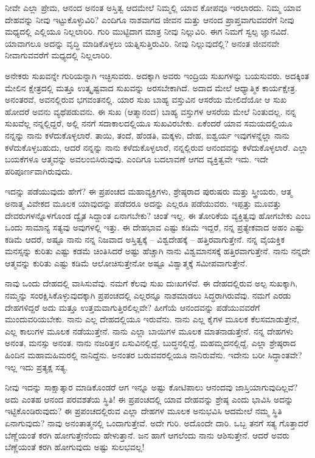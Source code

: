 ನೀವೇ ಎಲ್ಲಾ ಪ್ರೇಮ, ಆನಂದ ಅನಂತ ಅಸ್ತಿತ್ವ ಆದಮೇಲೆ ನಿಮ್ಮಲ್ಲಿ ಯಾವ ಕೋಪವೂ ಇರಲಾರದು. ನಿಮ್ಮ ಯಾವ ದೇಹವನ್ನು ನೀವು ಇಟ್ಟುಕೊಳ್ಳುವಿರಿ? ಎಂದಿಗೂ ನಾಶವಾಗದ ಜೀವನ ಮತ್ತು ಆನಂದ ಪ್ರಾಪ್ತವಾಗುವವರೆಗೆ ನೀವು ಮಧ್ಯದಲ್ಲಿ ಎಲ್ಲಿಯೂ ನಿಲ್ಲಲಾರಿರಿ. ಗುರಿ ಮುಟ್ಟಿದಾಗ ಮಾತ್ರ ನೀವು ನಿಲ್ಲುವಿರಿ. ಈಗ ನಿಮಗೆ ಸ್ವಲ್ಪ ಜ್ಞಾನವಿದೆ. ಯಾವಾಗಲೂ ಅದನ್ನು ವೃದ್ಧಿ ಮಾಡಿಕೊಳ್ಳಲು ಯತ್ನಿಸುತ್ತಿರುವಿರಿ. ನೀವು ನಿಲ್ಲುವುದೆಲ್ಲಿ? ಅನಂತ ಜೀವನವೇ ನೀವಾಗುವವರೆಗೆ ಮಧ್ಯದಲ್ಲಿ ನಿಲ್ಲಲಾರಿರಿ.

ಅನೇಕರು ಸುಖವನ್ನೇ ಗುರಿಯನ್ನಾಗಿ ಇಚ್ಛಿಸುವರು. ಅದಕ್ಕಾಗಿ ಅವರು ಇಂದ್ರಿಯ ಸುಖಗಳನ್ನು ಬಯಸುವರು. ಅದಕ್ಕಿಂತ ಮೇಲಿನ ಕ್ಷೇತ್ರದಲ್ಲಿ ಮತ್ತೂ ಉತ್ಕೃಷ್ಟವಾದ ಸುಖವನ್ನು ಅರಸಬೇಕಾಗಿದೆ. ಅದಾದ ಮೇಲೆ ಆಧ್ಯಾತ್ಮಿಕ ಕಾರ್ಯಕ್ಷೇತ್ರ. ಅನಂತರವೆ, ಅವನಲ್ಲಿರುವ ಭಗವಂತನಲ್ಲಿ. ಯಾರ ಸುಖ ಬಾಹ್ಯ ವಸ್ತುವಿನ ಆಸರೆಯ ಮೇಲಿದೆಯೋ ಆ ಸುಖ ಹೋದರೆ ಅವನು ವ್ಯಥೆಪಡುವನು. ಈ ಸುಖ (ಆತ್ಮಾನಂದ) ಬಾಹ್ಯ ವಸ್ತುಗಳ ಆಸರೆಯ ಮೇಲೆ ನಿಂತುದಲ್ಲ. ನನ್ನ ಸುಖವೆಲ್ಲ ನನ್ನಲ್ಲಿದ್ದರೆ, ಅಲ್ಲಿ ನನಗೆ ಸದಾಕಾಲದಲ್ಲಿಯೂ ಸುಖವಿರಬೇಕು. ಏಕೆಂದರೆ ಯಾವ ಸಮಯದಲ್ಲಿಯೂ ನನ್ನನ್ನು ನಾನು ಕಳೆದುಕೊಳ್ಳಲಾರೆ. ತಾಯಿ, ತಂದೆ, ಹೆಂಡತಿ, ಮಕ್ಕಳು, ದೇಹ, ಐಶ್ವರ್ಯ ಇವುಗಳನ್ನೆಲ್ಲಾ ನಾನು ಕಳೆದುಕೊಳ್ಳಬಹುದು, ಆದರೆ ನನ್ನನ್ನು ನಾನು ಕಳೆದುಕೊಳ್ಳಲಾರೆ, ನನ್ನಲ್ಲಿರುವ ಆನಂದವನ್ನು ಕಳೆದುಕೊಳ್ಳಲಾರೆ. ಎಲ್ಲಾ ಬಯಕೆಗಳೂ ಆತ್ಮವನ್ನು ಅವಲಂಬಿಸಿರುವುವು. ಎಂದಿಗೂ ಬದಲಾವಣೆ ಆಗದ ವ್ಯಕ್ತಿತ್ವವೇ ಇದು. ಇದೇ ಪರಿಪೂರ್ಣವಾಗಿರುವುದು.

ಇದನ್ನು ಪಡೆಯುವುದು ಹೇಗೆ? ಈ ಪ್ರಪಂಚದ ಮಹಾವ್ಯಕ್ತಿಗಳು, ಶ್ರೇಷ್ಠರಾದ ಪುರುಷರು ಮತ್ತು ಸ್ತ್ರೀಯರು, ಆತ್ಮ ಅನಾತ್ಮ ವಿವೇಕದ ಮೂಲಕ ಯಾವುದನ್ನು ಪಡೆದರೂ ಅದನ್ನು ಎಲ್ಲರೂ ಪಡೆಯುವರು. ಇಪ್ಪತ್ತು ಮೂವತ್ತು ದೇವರುಗಳನ್ನೊಳಗೊಂಡ ದ್ವೈತ ಸಿದ್ದಾಂತ ಏನಾಗಬೇಕು? ಚಿಂತೆ ಇಲ್ಲ. ಈ ತೋರಿಕೆಯ ವ್ಯಕ್ತಿತ್ವವು ಹೋಗಬೇಕು ಎಂಬ ಒಂದು ಸಾಮಾನ್ಯ ಸತ್ಯವು ಅವುಗಳಲ್ಲಿ ಇತ್ತು. ಈ ದೇಹಭಾವ ಎಷ್ಟು ಕಡಿಮೆ ಇದ್ದರೆ, ನನ್ನ ಪ್ರತ್ಯೇಕವಾದ ಅಹಂ ಎಷ್ಟು ಕಡಿಮೆ ಆದರೆ, ಅಷ್ಟೂ ನಾನು ನನ್ನ ನಿಜವಾದ ಅಸ್ತಿತ್ವಕ್ಕೆ – ವಿಶ್ವದೇಹಕ್ಕೆ – ಹತ್ತಿರವಾಗುತ್ತೇನೆ. ನನ್ನ ವೈಯಕ್ತಿಕ ಮನಸ್ಸನ್ನು ಕುರಿತು ಎಷ್ಟು ಕಡಮೆ ಚಿಂತಿಸಿದರೆ ಅಷ್ಟು ಹೆಚ್ಚಾಗಿ ನಾನು ವಿಶ್ವಮಾನಸಕ್ಕೆ ಹತ್ತಿರವಾಗುತ್ತೇನೆ. ನಾನು ನನ್ನದೇ ಆತ್ಮವನ್ನು ಕುರಿತು ಎಷ್ಟು ಕಡಿಮೆ ಆಲೋಚಿಸುತ್ತೇನೋ ಅಷ್ಟೂ ವಿಶ್ವಾತ್ಮಕ್ಕೆ ಸಮೀಪವಾಗುತ್ತೇನೆ.

ನಾವು ಒಂದು ದೇಹದಲ್ಲಿ ವಾಸಿಸುವೆವು. ನಮಗೆ ಕೆಲವು ಸುಖ ದುಃಖಗಳಿವೆ. ಈ ದೇಹದಲ್ಲಿರುವ ಅಲ್ಪ ಸುಖಕ್ಕಾಗಿ, ನಮ್ಮನ್ನು ಸಂರಕ್ಷಿಸಿಕೊಳ್ಳುವುದಕ್ಕಾಗಿ ಪ್ರಪಂಚದಲ್ಲಿ ಎಲ್ಲರನ್ನೂ ನಾಶಮಾಡಲು ಸಿದ್ಧರಾಗಿರುವೆವು. ನಮಗೆ ಎರಡು ದೇಹಗಳಿದ್ದರೆ ಅದು ಮತ್ತೂ ಉತ್ತಮವಾಗುತ್ತಿರಲಿಲ್ಲವೇ? ಹೀಗೆಯೆ ಆನಂದವನ್ನು ಪಡೆಯುವವರೆಗೆ ಮುಂದುವರಿಯಬೇಕು. ನಾನು ಎಲ್ಲ ದೇಹದಲ್ಲಿಯೂ ಇರುವೆನು. ನಾನು ಎಲ್ಲ ಕೈಗಳ ಮೂಲಕ ಕೆಲಸಮಾಡುತ್ತೇನೆ, ಎಲ್ಲ ಕಾಲುಗಳ ಮೂಲಕ ನಡೆಯುತ್ತೇನೆ. ನಾನು ಎಲ್ಲಾ ಬಾಯಿಗಳ ಮೂಲಕ ಮಾತನಾಡುತ್ತೇನೆ. ನನ್ನ ದೇಹಗಳು ಅನಂತ, ಮನಸ್ಸು ಅನಂತ. ನಾನು ನಜರಿತ್ತನ ಏಸುವಿನಲ್ಲಿದ್ದೆ, ಬುದ್ಧನಲ್ಲಿದ್ದೆ, ಮಹಮ್ಮದನಲ್ಲಿದ್ದೆ, ಎಲ್ಲಾ ಶ್ರೇಷ್ಠರಾದ ಹಿಂದಿನ ಮಹಾಮಹಿಮರಲ್ಲಿ ನಾನಿದ್ದೆನು. ಅನಂತರ ಬರುವವರಲ್ಲಿಯೂ ನಾನಿರುವೆನು. ಇದೇನು ಬರೀ ಸಿದ್ಧಾಂತವೇ? ಇಲ್ಲ ಇದು ಪ್ರತ್ಯಕ್ಷ ಸತ್ಯ.

ನೀವು ಇದನ್ನು ಸಾಕ್ಷಾತ್ಕಾರ ಮಾಡಿಕೊಂಡರೆ ಆಗ ಇನ್ನೂ ಅಷ್ಟು ಕೋಟಿಪಾಲು ಆನಂದವು ಜಾಸ್ತಿಯಾಗುವುದಿಲ್ಲವೆ? ಅದು ಎಂತಹ ಆನಂದ ಪರವಶತೆಯ ಸ್ಥಿತಿ! ಈ ಪ್ರಪಂಚದಲ್ಲಿ ಯಾವ ದೇಹವನ್ನು ಶ್ರೇಷ್ಠ ಎಂದು ಭಾವಿಸಿ ಅದನ್ನು ಇಟ್ಟಿಕೊಂಡಿರುವುದು? ಈ ಪ್ರಪಂಚದಲ್ಲಿರುವ ಎಲ್ಲಾ ದೇಹಗಳ ಮೂಲಕ ಅನುಭವಿಸಿ ಆದಮೇಲೆ ನಮ್ಮ ಸ್ಥಿತಿ ಏನಾಗುವುದು? ನಾವು ಅನಂತಾತ್ಮನಲ್ಲಿ ಒಂದಾಗುತ್ತೇವೆ. ಅದೇ ಗುರಿ. ಅದೊಂದೇ ದಾರಿ. ಒಬ್ಬ ತನಗೆ ಸತ್ಯ ಗೊತ್ತಾದರೆ ಬೆಣ್ಣೆಯಂತೆ ಕರಗಿ ಹೋಗುತ್ತೇನೆಂದು ಹೇಳುತ್ತಾನೆ. ಜನ ಹಾಗೆ ಆಗಲೆಂದು ನಾನು ಆಶಿಸುತ್ತೇನೆ. ಆದರೆ ಅವರು ಬೆಣ್ಣೆಯಂತೆ ಕರಗಿ ಹೋಗುವುದು ಅಷ್ಟು ಸುಲಭವಲ್ಲ!

